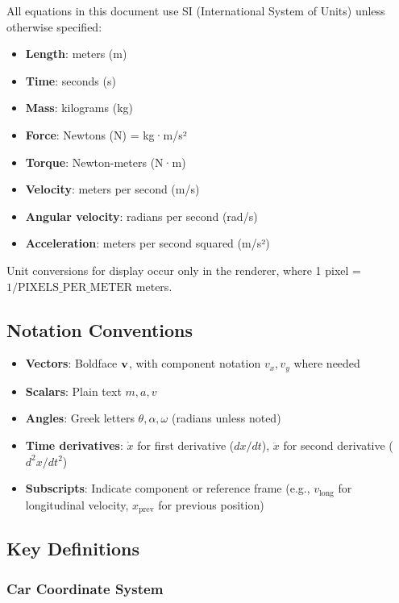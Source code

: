 All equations in this document use SI (International System of Units) unless otherwise specified:

\begin{itemize}
  \item \textbf{Length}: meters (m)
  \item \textbf{Time}: seconds (s)
  \item \textbf{Mass}: kilograms (kg)
  \item \textbf{Force}: Newtons (N) = kg·m/s²
  \item \textbf{Torque}: Newton-meters (N·m)
  \item \textbf{Velocity}: meters per second (m/s)
  \item \textbf{Angular velocity}: radians per second (rad/s)
  \item \textbf{Acceleration}: meters per second squared (m/s²)
\end{itemize}

Unit conversions for display occur only in the renderer, where 1 pixel = $1/\text{PIXELS\_PER\_METER}$ meters.

\subsection*{Notation Conventions}

\begin{itemize}
  \item \textbf{Vectors}: Boldface $\mathbf{v}$, with component notation $v_x, v_y$ where needed
  \item \textbf{Scalars}: Plain text $m, a, v$
  \item \textbf{Angles}: Greek letters $\theta, \alpha, \omega$ (radians unless noted)
  \item \textbf{Time derivatives}: $\dot{x}$ for first derivative ($dx/dt$), $\ddot{x}$ for second derivative ($d^2x/dt^2$)
  \item \textbf{Subscripts}: Indicate component or reference frame (e.g., $v_{\text{long}}$ for longitudinal velocity, $x_{\text{prev}}$ for previous position)
\end{itemize}

\subsection*{Key Definitions}

\subsubsection*{Car Coordinate System}

